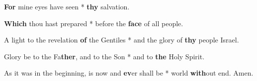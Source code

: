 \begin{multicols}{2}
	\textbf{For} mine eyes have seen * \textbf{thy} salvation.

	\textbf{Which} thou hast prepared * before the \textbf{face} of all people.

	A light to the revelation \textbf{of} the Gentiles * and the glory of \textbf{thy} people Israel.
	
	Glory be to the Fa\textbf{ther}, and to the Son * and to \textbf{the} Holy Spirit.
	
	As it was in the beginning, is now and \textbf{ev}er shall be * world \textbf{with}out end. Amen.
\end{multicols}